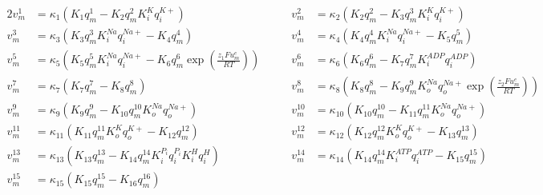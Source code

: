 \begin{alignat*}{2}
v_m^{1}  &= \kappa_1 \left( K_1 q_m^1 - K_2 q_m^2 K_i^{K} q_i^{K+} \right)
&\qquad
v_m^{2}  &= \kappa_2 \left( K_2 q_m^2 - K_3 q_m^3 K_i^{K} q_i^{K+} \right) \\[6pt]
v_m^{3}  &= \kappa_3 \left( K_3 q_m^3 K_i^{Na} q_i^{Na+} - K_4 q_m^4 \right)
&\qquad
v_m^{4}  &= \kappa_4 \left( K_4 q_m^4 K_i^{Na} q_i^{Na+} - K_5 q_m^5 \right) \\[6pt]
v_m^{5}  &= \kappa_5 \left( K_5 q_m^5 K_i^{Na} q_i^{Na+}
            - K_6 q_m^6 \exp\left( \frac{z_1 F u_m^e}{RT} \right) \right)
&\qquad
v_m^{6}  &= \kappa_6 \left( K_6 q_m^6 - K_7 q_m^7 K_i^{ADP} q_i^{ADP} \right) \\[6pt]
v_m^{7}  &= \kappa_7 \left( K_7 q_m^7 - K_8 q_m^8 \right)
&\qquad
v_m^{8}  &= \kappa_8 \left( K_8 q_m^8 - K_9 q_m^9 K_o^{Na} q_o^{Na+}
             \exp\left( \frac{z_2 F u_m^e}{RT} \right) \right) \\[6pt]
v_m^{9}  &= \kappa_9 \left( K_9 q_m^9 - K_{10} q_m^{10} K_o^{Na} q_o^{Na+} \right)
&\qquad
v_m^{10} &= \kappa_{10} \left( K_{10} q_m^{10} - K_{11} q_m^{11} K_o^{Na} q_o^{Na+} \right) \\[6pt]
v_m^{11} &= \kappa_{11} \left( K_{11} q_m^{11} K_o^{K} q_o^{K+} - K_{12} q_m^{12} \right)
&\qquad
v_m^{12} &= \kappa_{12} \left( K_{12} q_m^{12} K_o^{K} q_o^{K+} - K_{13} q_m^{13} \right) \\[6pt]
v_m^{13} &= \kappa_{13} \left( K_{13} q_m^{13}
             - K_{14} q_m^{14} K_i^{P_i} q_i^{P_i} K_i^{H} q_i^{H} \right)
&\qquad
v_m^{14} &= \kappa_{14} \left( K_{14} q_m^{14} K_i^{ATP} q_i^{ATP}
             - K_{15} q_m^{15} \right) \\[6pt]
v_m^{15} &= \kappa_{15} \left( K_{15} q_m^{15} - K_{16} q_m^{16} \right)
& &
\end{alignat*}
